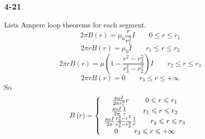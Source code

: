 \documentclass[a4paper,11pt]{amsart}
\theoremstyle{definition}
\begin{document}
	\subsubsection*{4-21}
	Lists Ampere loop theorems for each segment.
	$$
	2\pi B(r)=\mu_0\dfrac{r}{r_1^2}I\qquad0\leqslant r\leqslant r_1
	$$	
	$$
	2\pi rB\left( r \right) =\mu _0I\qquad r_1\leqslant r\leqslant r_2
	$$
	$$
	2\pi rB\left( r \right) =\mu \left( 1-\frac{r^2-r_{2}^{2}}{r_{3}^{2}-r_{2}^{2}} \right) I\qquad r_2\leqslant r\leqslant r_3
	$$
	$$
	2\pi rB\left( r \right) =0\qquad r_3\leqslant r\leqslant +\infty 
	$$
	So
	$$
	B\left( r \right) =\left\{ \begin{array}{c}
		\frac{\mu _0I}{2\pi r_{1}^{2}}r\qquad \,\,        0\leqslant r\leqslant r_1\\
		\frac{\mu _0I}{2\pi}\frac{1}{r}\qquad \,\,         r_1\leqslant r\leqslant r_2\\
		\frac{\mu _0I}{2\pi}\frac{r_{3}^{2}-r^2}{r_{3}^{2}-r_{2}^{2}}\frac{1}{r}\qquad r_2\leqslant r\leqslant r_3\\
		0\qquad \,\,                    r_3\leqslant r\leqslant +\infty\\
	\end{array} \right. 
	\\	
	$$
\end{document}
